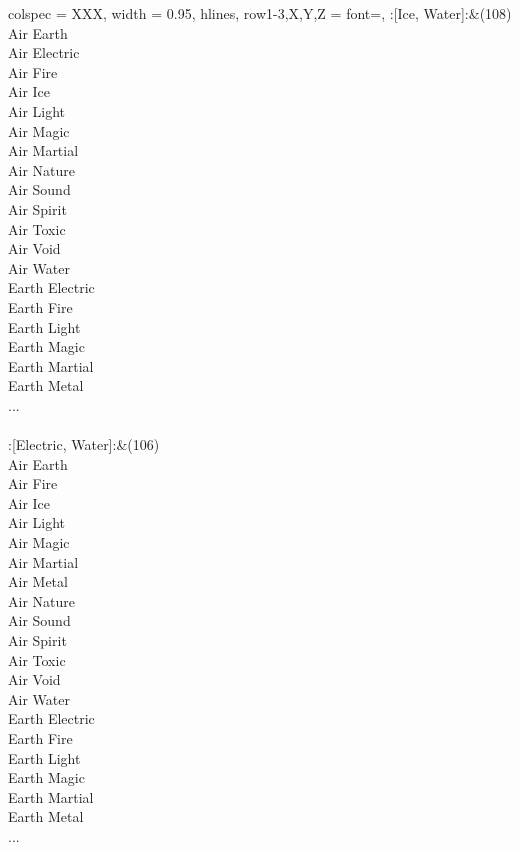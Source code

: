 \begin{longtblr}[
	caption = {2v2 Defending Weak},
	label = {2v2-Defending-Weak},
]{
	colspec = {XXX}, width = 0.95\linewidth,
	hlines,
	row{1-3,X,Y,Z} = {font=\bfseries},
}
	:[Ice, Water]:&{(108)\\
	Air Earth \\
	Air Electric \\
	Air Fire \\
	Air Ice \\
	Air Light \\
	Air Magic \\
	Air Martial \\
	Air Nature \\
	Air Sound \\
	Air Spirit \\
	Air Toxic \\
	Air Void \\
	Air Water \\
	Earth Electric \\
	Earth Fire \\
	Earth Light \\
	Earth Magic \\
	Earth Martial \\
	Earth Metal \\
	...\\
	}\\

	:[Electric, Water]:&{(106)\\
	Air Earth \\
	Air Fire \\
	Air Ice \\
	Air Light \\
	Air Magic \\
	Air Martial \\
	Air Metal \\
	Air Nature \\
	Air Sound \\
	Air Spirit \\
	Air Toxic \\
	Air Void \\
	Air Water \\
	Earth Electric \\
	Earth Fire \\
	Earth Light \\
	Earth Magic \\
	Earth Martial \\
	Earth Metal \\
	...\\
	}\\


\end{longtblr}

